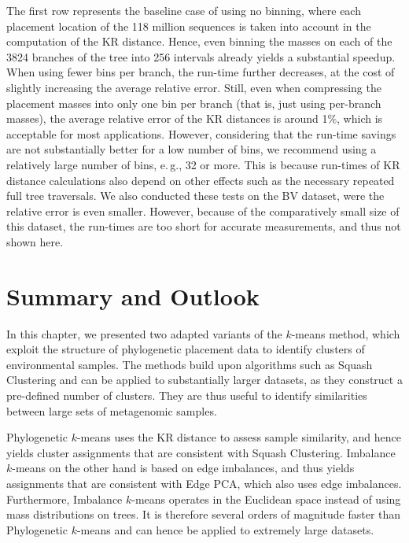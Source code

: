 The first row represents the baseline case of using no binning,
where each placement location of the \num{118} million sequences
is taken into account in the computation of the KR distance.
Hence, even binning the masses on each of the \num{3 824} branches of the tree into \num{256} intervals
already yields a substantial speedup.
When using fewer bins per branch, the run-time further decreases,
at the cost of slightly increasing the average relative error.
Still, even when compressing the placement masses into only one bin per branch (that is, just using per-branch masses),
the average relative error of the KR distances is around 1\%, which is acceptable for most applications.
However, considering that the run-time savings are not substantially better for a low number of bins,
we recommend using a relatively large number of bins, e.\,g., \num{32} or more.
This is because run-times of KR distance calculations also depend on other effects
such as the necessary repeated full tree traversals.
We also conducted these tests on the \ac{BV} dataset, were the relative error is even smaller.
However, because of the comparatively small size of this dataset, the run-times are too short for accurate measurements,
and thus not shown here.


\section{Summary and Outlook}
\label{ch:Clustering:sec:SummaryOutlook}

In this chapter, we presented two adapted variants of the $k$-means method,
which exploit the structure of phylogenetic placement data to identify clusters of environmental samples.
The methods build upon algorithms such as Squash Clustering and can be applied to substantially larger datasets,
as they construct a pre-defined number of clusters.
They are thus useful to identify similarities between large sets of metagenomic samples.

Phylogenetic $k$-means uses the KR distance to assess sample similarity,
and hence yields cluster assignments that are consistent with Squash Clustering.
Imbalance $k$-means on the other hand is based on edge imbalances,
and thus yields assignments that are consistent with Edge PCA, which also uses edge imbalances.
Furthermore, Imbalance $k$-means operates in the Euclidean space instead of using mass distributions on trees.
It is therefore several orders of magnitude faster than Phylogenetic $k$-means
and can hence be applied to extremely large datasets.


